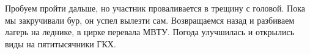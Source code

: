 Пробуем пройти дальше, но участник проваливается в трещину с головой. Пока мы закручивали бур, он успел вылезти сам. Возвращаемся назад и разбиваем лагерь на леднике, в цирке перевала МВТУ. Погода улучшилась и открылись виды на пятитысячники ГКХ.











    \FloatBarrier
